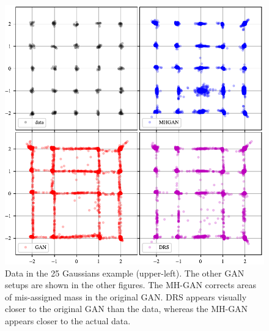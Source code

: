 \begin{figure}[htbp]
    \centering
    \includegraphics[scale=1.0]{figures/mog_example_30.pdf}
    \caption{{\small
    Data in the 25 Gaussians example (upper-left)\@.
    The other GAN setups are shown in the other figures.
    The MH-GAN corrects areas of mis-assigned mass in the original GAN\@.
    DRS appears visually closer to the original GAN than the data, whereas the MH-GAN appears closer to the actual data.
    }}
    \label{fig:mog_example}
\end{figure}

